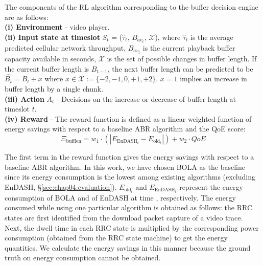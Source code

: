 \indent The components of the \ac{RL} algorithm corresponding to the buffer decision engine are as follows:\\
\noindent \textbf{(i) Environment}   - video player.\\
\noindent \textbf{(ii) Input state at timeslot } $S_t$ =  ($\hat{\tau}_{{t}}$, $B_{av_t}$, ${\mathcal{X}}$), where
  $\hat{\tau}_{{t}}$ is the  average predicted cellular network throughput,
 $B_{av_t}$ is the current playback buffer capacity available in seconds,
$\mathcal{X}$ is the set of possible changes in buffer length. If the current buffer length is $B_{t-1}$, the next buffer length can be predicted to be $\hat{B_t}= B_t+x$ where $x\in\mathcal{X}:=\{-2,-1,0,+1,+2\}$. $x=1$ implies an increase in buffer length by a single chunk.\\
\noindent \textbf{(iii) Action} $A_t$ - Decisions on the increase or decrease of buffer length at timeslot $t$. \\
\noindent \textbf{(iv) Reward} - The reward function is defined as a linear weighted function of energy savings with respect to a baseline ABR algorithm and the QoE score:
    \begin{equation}
    \Xi_{\mathrm{bufflen}} = w_1 \cdot (\left|E_{\mathrm{EnDASH}_t}-E_{\mathrm{old}_t}\right|)+w_2 \cdot QoE
    \end{equation}

\indent The first term in the reward function gives the energy savings with respect to a baseline ABR algorithm. In this work, we have chosen BOLA \cite{Spiteri2016} as the baseline since its energy consumption is the lowest among existing algorithms (excluding EnDASH, \S{\ref{sec:chap04:evaluation}}).  $E_{\mathrm{old}_t}$ and $E_{\mathrm{EnDASH}_t}$ represent the energy consumption of BOLA and of EnDASH at time , respectively. The energy consumed while using one particular algorithm is obtained as follows:  the RRC states are first identified from the download packet capture of a video trace. Next, the dwell time in each RRC state is multiplied by the corresponding power consumption (obtained from the RRC state machine) to get the energy quantities. We calculate the energy savings in this manner because the ground truth on energy consumption cannot be obtained.

